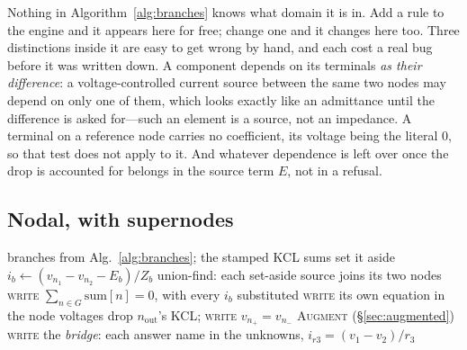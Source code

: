 \documentclass[11pt,oneside]{report}
\newcommand{\kw}[1]{\textsc{#1}}
\begin{document}
Nothing in Algorithm~\ref{alg:branches} knows what domain it is in.
Add a rule to the engine and it appears here for free; change one and
it changes here too. Three distinctions inside it are easy to get
wrong by hand, and each cost a real bug before it was written down. A
component depends on its terminals \emph{as their difference}: a
voltage-controlled current source between the same two nodes may
depend on only one of them, which looks exactly like an admittance
until the difference is asked for---such an element is a source, not
an impedance. A terminal on a reference node carries no coefficient,
its voltage being the literal $0$, so that test does not apply to it.
And whatever dependence is left over once the drop is accounted for
belongs in the source term $E$, not in a refusal.

\subsection{Nodal, with supernodes}

\begin{algorithm}[htbp]
\caption{\kw{By-Hand-Nodal}: the node-voltage system}
\label{alg:bhnodal}
\begin{algorithmic}[1]
\Require branches from Alg.~\ref{alg:branches}; the stamped KCL sums
    \State set it aside
  \Else
    \State $i_b \gets (v_{n_1} - v_{n_2} - E_b)/Z_b$
  \EndIf
\EndFor
\State union-find: each set-aside source joins its two nodes
  \State \kw{write} $\sum_{n \in G} \mathrm{sum}[n] = 0$, with every
    $i_b$ substituted
\EndFor
{}
  \State \kw{write} its own equation in the node voltages
\EndFor
{}
  \State drop $n_\mathrm{out}$'s KCL; \kw{write} $v_{n_+} = v_{n_-}$
\EndFor
\State \kw{Augment} (\S\ref{sec:augmented})
\State \kw{write} the \emph{bridge}: each answer name in the
  unknowns, $i_{r3} = (v_1 - v_2)/r_3$
\end{algorithmic}
\end{algorithm}
\end{document}
